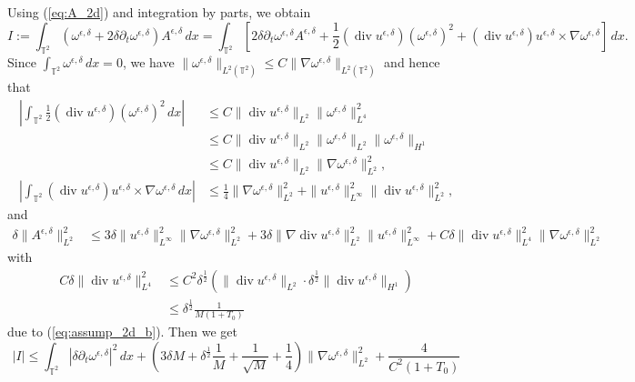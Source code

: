 \documentclass[reqno,10pt]{amsart}
\theoremstyle{definition}
\theoremstyle{remark}
\numberwithin{equation}{section}
\DeclareMathOperator{\dive}{div}
\begin{document}
Using (\ref{eq:A_2d}) and integration by parts, we obtain
\[
    I:=\int_{\mathbb T^2} (\omega^{\epsilon,\delta} + 2\delta\partial_t\omega^{\epsilon,\delta})A^{\epsilon,\delta}\,dx
    = \int_{\mathbb T^2} \left[ 2\delta\partial_t\omega^{\epsilon,\delta}A^{\epsilon,\delta} + \frac{1}{2}(\dive u^{\epsilon,\delta})(\omega^{\epsilon,\delta})^2 + (\dive u^{\epsilon,\delta}) u^{\epsilon,\delta}\times \nabla \omega^{\epsilon,\delta} \right] \,dx.
\]
Since $\int_{\mathbb T^2} \omega^{\epsilon,\delta}\,dx=0$, we have $\|\omega^{\epsilon,\delta}\|_{L^2(\mathbb T^2)}\le C\|\nabla\omega^{\epsilon,\delta}\|_{L^2(\mathbb T^2)}$ and hence that
\[
\begin{aligned}
    \left| \int_{\mathbb T^2} \frac{1}{2}(\dive u^{\epsilon,\delta})(\omega^{\epsilon,\delta})^2 \,dx \right| &\le C \| \dive u^{\epsilon,\delta} \|_{L^2} \|\omega^{\epsilon,\delta}\|_{L^4}^2 \\
    &\le C \| \dive u^{\epsilon,\delta} \|_{L^2} \|\omega^{\epsilon,\delta}\|_{L^2} \|\omega^{\epsilon,\delta}\|_{H^1}\\
    &\le C \| \dive u^{\epsilon,\delta} \|_{L^2} \|\nabla\omega^{\epsilon,\delta}\|_{L^2}^2,\\
    \left| \int_{\mathbb T^2} (\dive u^{\epsilon,\delta})u^{\epsilon,\delta} \times \nabla \omega^{\epsilon,\delta} \,dx \right| &\le \frac{1}{4}\|\nabla \omega^{\epsilon,\delta}\|_{L^2}^2 + \|u^{\epsilon,\delta}\|_{L^\infty}^2 \|\dive u^{\epsilon,\delta}\|_{L^2}^2,
\end{aligned}
\]
and
\[
\begin{aligned}
    \delta \| A^{\epsilon,\delta} \|_{L^2}^2 &\le 3\delta \| u^{\epsilon,\delta}\|_{L^\infty}^2 \|\nabla\omega^{\epsilon,\delta}\|_{L^2}^2 + 3\delta \|\nabla\dive u^{\epsilon,\delta}\|_{L^2}^2 \|u^{\epsilon,\delta}\|_{L^\infty}^2 + C\delta \|\dive u^{\epsilon,\delta}\|_{L^4}^2 \|\nabla\omega^{\epsilon,\delta}\|_{L^2}^2
\end{aligned}
\]
with
\[
\begin{aligned}
    C\delta\|\dive u^{\epsilon,\delta}\|_{L^4}^2 &\le C^2 \delta^{\frac{1}{2}} \left( \|\dive u^{\epsilon,\delta}\|_{L^2} \cdot\delta^{\frac{1}{2}} \|\dive u^{\epsilon,\delta}\|_{H^1} \right) \\
    &\le \delta^{\frac{1}{2}}\frac{1}{M(1+T_0)}
\end{aligned}
\]
due to (\ref{eq:assump_2d_b}). Then we get
\[
    \left| I \right| \le \int_{\mathbb T^2} |\delta \partial_t\omega^{\epsilon,\delta}|^2\,dx + \left(3\delta M+\delta^{\frac{1}{2}}\frac{1}{M} + \frac{1}{\sqrt M} + \frac{1}{4}\right) \|\nabla\omega^{\epsilon,\delta}\|_{L^2}^2 + \frac{4}{C^2 (1+T_0)}
\]
\end{document}
